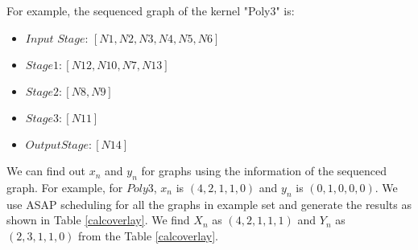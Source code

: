 

For example, the sequenced graph of the kernel "Poly3" is:
\begin{itemize}
	\item $Input$ $Stage$: $[N1, N2, N3, N4, N5, N6]$
	\item $Stage 1: [N12, N10, N7, N13]$
	\item $Stage 2: [N8, N9]$
	\item $Stage 3: [N11]$
	\item $Output Stage: [N14]$	
\end{itemize}

We can find out $x_{n}$ and $y_{n}$ for graphs using the information of the sequenced graph.
For example, for $Poly3$, $x_{n}$ is $(4, 2, 1, 1, 0)$ and $y_{n}$ is $(0, 1, 0, 0, 0)$.
We use ASAP scheduling for all the graphs in example set and generate the results as shown in Table \ref{calcoverlay}.
We find $X_{n}$ as $(4, 2, 1, 1, 1)$ and $Y_{n}$ as $(2, 3, 1, 1, 0)$ from the Table \ref{calcoverlay}.

